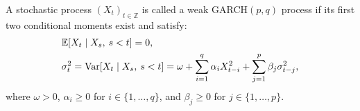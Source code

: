 \begin{defn}\label{flotdo}
A stochastic process $(X_{t})_{t\in\mathbb{Z}}$ is called a weak GARCH$(p,q)$ process if its first two conditional moments exist and satisfy:
\begin{subequations}
\begin{align}
    & \mathbb{E}\left[X_{t}\mid X_{s},\hspace{2 pt} s<t\right] =0,\\
    & \sigma_{t}^{2} =\textrm{Var}\left[X_{t}\mid X_{s},\hspace{2 pt} s<t\right]=\omega+\sum_{i=1}^{q}\alpha_{i}X_{t-i}^{2}+\sum_{j=1}^{p}\beta_{j}\sigma_{t-j}^{2}, 
\end{align}
\end{subequations}
where $\omega >0$, $\alpha_{i}\geq 0$ for $i\in \{1,\dots, q\}$, and $\beta_{j}\geq 0$ for $j\in \{1,\dots, p\}$. 
\end{defn}


